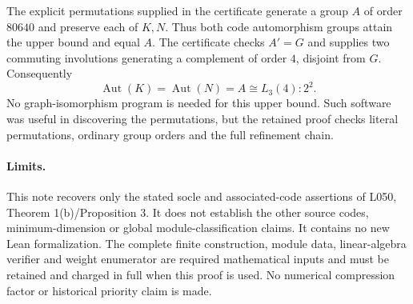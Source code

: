 \documentclass[11pt,a4paper]{article}
\newcommand{\Aut}{\operatorname{Aut}}
\begin{document}
The explicit permutations supplied in the certificate generate a group
$A$ of order $80640$ and preserve each of $K,N$. Thus both code automorphism
groups attain the upper bound and equal $A$. The certificate checks
$A'=G$ and supplies two commuting involutions generating a complement of
order $4$, disjoint from $G$. Consequently
\[
 \Aut(K)=\Aut(N)=A\cong L_3(4):2^2.
\]
No graph-isomorphism program is needed for this upper bound. Such software
was useful in discovering the permutations, but the retained proof checks
literal permutations, ordinary group orders and the full refinement chain.

\paragraph{Limits.}
This note recovers only the stated socle and associated-code assertions of
L050, Theorem 1(b)/Proposition 3. It does not establish the other source codes,
minimum-dimension or global module-classification claims. It contains no
new Lean formalization. The complete finite construction, module data,
linear-algebra verifier and weight enumerator are required mathematical
inputs and must be retained and charged in full when this proof is used.
No numerical compression factor or historical priority claim is made.
\end{document}

